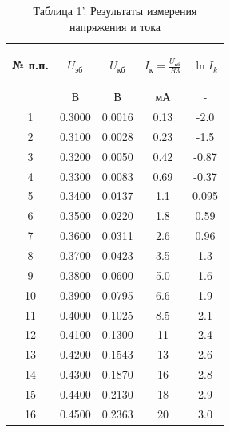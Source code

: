 \begin{center}
\begin{table}[H]
\centering
\caption*{Таблица 1'. Результаты измерения напряжения и тока}
\label{tab:2}
\begin{tabular}{|c|c|c|c|c|}
\hline
\begin{minipage}{7mm}
    № п.п. 
\end{minipage}&
\begin{minipage}{3.8cm}
   \begin{center}
   $U_{\text{эб}}$
   \end{center}
\end{minipage} &
\begin{minipage}{3.8cm}
   \begin{center}
   $U_{\text{кб}}$
   \end{center}
\end{minipage} &
\begin{minipage}{3.8cm}
    \begin{center}
    $I_{\text{к}}=\frac{U_{\text{кб}}}{R3}$
    \end{center}
\end{minipage}&
\begin{minipage}{3.8cm}
   \begin{center}
   $\ln I_k$
   \end{center}
\end{minipage}\\
\hline
{}&В&В&мА&-\\
\hline
1  & 0.3000 & 0.0016 & 0.13 & -2.0 \\
2  & 0.3100 & 0.0028 & 0.23 & -1.5\\
3  & 0.3200 & 0.0050 & 0.42 & -0.87\\
4  & 0.3300 & 0.0083 & 0.69 & -0.37\\
5  & 0.3400 & 0.0137 & 1.1 & 0.095\\
6  & 0.3500 & 0.0220 & 1.8 & 0.59\\
7  & 0.3600 & 0.0311 & 2.6 & 0.96\\
8  & 0.3700 & 0.0423 & 3.5 & 1.3\\
9  & 0.3800 & 0.0600 & 5.0 & 1.6\\
10 & 0.3900 & 0.0795 & 6.6 & 1.9 \\
11 & 0.4000 & 0.1025 & 8.5 & 2.1\\
12 & 0.4100 & 0.1300 & 11 & 2.4\\
13 & 0.4200 & 0.1543 & 13 & 2.6\\
14 & 0.4300 & 0.1870 & 16 & 2.8\\
15 & 0.4400 & 0.2130 & 18 & 2.9\\
16 & 0.4500 & 0.2363 & 20 & 3.0\\
\hline
\end{tabular}
\end{table}
\end{center}

